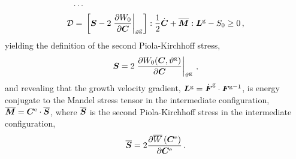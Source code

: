 \documentclass[10pt,letterpaper,oneside]{report}
\newcommand{\ten}[1]{\mbox{\boldmath $#1$}{}}
\newcommand{\scas}[1]{\mbox{{\scriptsize{${\rm{#1}}$}}}{}}
\begin{document}
\begin{align}
\cdots{}& \notag \\
\mathcal{D} ={}& \left[ \ten{S} - 2 \left. \frac{\partial W_0}{\partial \ten{C}} \right|_{\vartheta^{\scas{g}}} \right] : \frac{1}{2} \dot{\ten{C}} + \overline{\ten{M}} : \ten{L}^{\scas{g}} - S_0 \geq 0 \, , 
\end{align}
yielding the definition of the second Piola-Kirchhoff stress,
\begin{equation}
\ten{S} = 2 \left. \frac{\partial W_0 ( \ten{C}, \vartheta^{\scas{g}}) }{\partial \ten{C}} \right|_{\vartheta^{\scas{g}}} \, ,
\label{SPK_ref}
\end{equation}
and revealing that the growth velocity gradient, $\ten{L}^{\scas{g}} = \dot{\ten{F}}^{\scas{g}} \cdot \ten{F}^{\scas{g}-1}$, is energy conjugate to the Mandel stress tensor in the intermediate configuration, $\overline{\ten{M}} = \ten{C}^{\scas{e}} \cdot \overline{\ten{S}} $, where $\overline{\ten{S}}$ is the second Piola-Kirchhoff stress in the intermediate configuration,
\begin{equation}
\overline{\ten{S}} = 2 \frac{ \partial \overline{W} \left( \ten{C}^{\scas{e}} \right) }{ \partial \ten{C}^{\scas{e}} } \, .
\label{SPK_int}
\end{equation}
\end{document}
